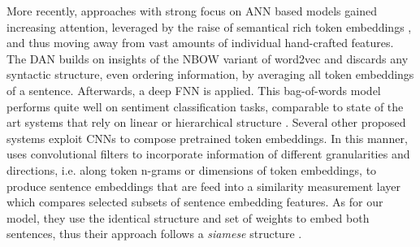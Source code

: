 More recently, approaches with strong focus on \acf{ANN} based models gained increasing attention, leveraged by the raise of semantical rich token embeddings \autocite{mikolov_distributed_2013, pennington_glove_2014, wieting_paraphrase_2015}, and thus moving away from vast amounts of individual hand-crafted features. The \ac{DAN} \autocite{iyyer_deep_2015} builds on insights of the NBOW variant of word2vec \autocite{mikolov_distributed_2013} and discards any syntactic structure, even ordering information, by averaging all token embeddings of a sentence. Afterwards, a deep \ac{FNN} is applied. This bag-of-words model performs quite well on sentiment classification tasks, comparable to state of the art systems that rely on linear \autocite{kim_convolutional_2014} or hierarchical structure \autocite{tai_improved_2015}. Several other proposed systems \autocite{kim_convolutional_2014,kalchbrenner_convolutional_2014,hu_convolutional_2014,yin_convolutional_2015,he_multi-perspective_2015} exploit \acfp{CNN} \autocite{lecun_convolutional_1995} to compose pretrained token embeddings. In this manner, \textcite{he_multi-perspective_2015} uses convolutional filters to incorporate information of different granularities and directions, i.e. along token n-grams or dimensions of token embeddings, to produce sentence embeddings that are feed into a similarity measurement layer which compares selected subsets of sentence embedding features. As for our model, they use the identical structure and set of weights to embed both sentences, thus their approach follows a \textit{siamese} structure \autocite{bromley_signature_1994}. %

